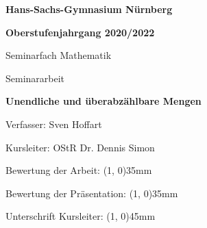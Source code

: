 \documentclass[12pt]{article}
\begin{document}
    \thispagestyle{empty}

    {
        \centering

        \begin{singlespace}

        \textbf{Hans-Sachs-Gymnasium Nürnberg}

        \textbf{Oberstufenjahrgang 2020/2022}

        \end{singlespace}

        \bigskip

        Seminarfach Mathematik

        \bigskip

        Seminararbeit

        \bigskip
        \bigskip

        \textbf{Unendliche und überabzählbare Mengen}

        \bigskip
        \bigskip

    }

    \hspace*{30mm}Verfasser: \hspace*{22mm} Sven Hoffart

    \bigskip

    \hspace*{30mm}Kursleiter: \hspace*{20mm} OStR Dr. Dennis Simon

    \bigskip

    \hspace*{30mm}Bewertung der Arbeit: \hspace*{10mm} \line(1, 0){35mm}

    \bigskip

    \hspace*{30mm}Bewertung der Präsentation: \line(1, 0){35mm}

    \bigskip
    \bigskip
    \bigskip
    \bigskip
    \bigskip

    \hspace*{30mm}Unterschrift Kursleiter: \hspace*{8mm} \line(1, 0){45mm}

    \bigskip

    \newpage

    \thispagestyle{empty}

    \tableofcontents

    \newpage

    \setcounter{page}{3}

\end{document}
